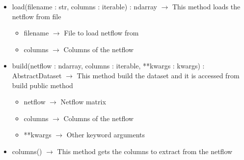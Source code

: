 \begin{description}
\begin{itemize}
\item load(filename : str, columns : iterable) : ndarray $\rightarrow$ This method loads the netflow from file\begin{itemize}
\item filename $\rightarrow$ File to load netflow from
\item columns $\rightarrow$ Columns of the netflow
\end{itemize}

\item build(netflow : ndarray, columns : iterable, **kwargs : kwargs) : AbstractDataset $\rightarrow$ This method build the dataset and it is accessed from build public method\begin{itemize}
\item netflow $\rightarrow$ Netflow matrix
\item columns $\rightarrow$ Columns of the netflow
\item **kwargs $\rightarrow$ Other keyword arguments
\end{itemize}

\item columns() $\rightarrow$ This method gets the columns to extract from the netflow
\end{itemize}

\end{description}
\hypertarget{datasets::DatasetBuilder}{}
